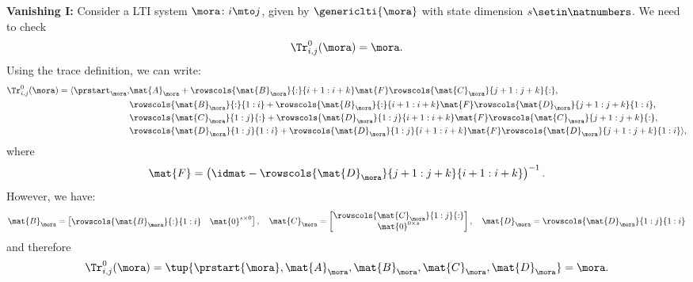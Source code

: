\begin{example}
\begin{equation*}
    \end{equation*}
    \textbf{Vanishing I:}
    Consider a LTI system $\mora\colon i\mto j$, given by $\genericlti{\mora}$ with state dimension $s\setin \natnumbers$.
    We need to check
    \begin{equation*}
        \Tr_{i,j}^0 (\mora)=\mora.
    \end{equation*}
    Using the trace definition, we can write:
    \begin{equation*}
        \begin{aligned}
            \Tr_{i,j}^0 (\mora)=\langle\prstart_{\mora}, & \mat{A}_\mora+\rowscols{\mat{B}_{\mora}}{:}{i+1:i+k}\mat{F}\rowscols{\mat{C}_{\mora}}{j+1:j+k}{:}, \\
                                                         & \rowscols{\mat{B}_{\mora}}{:}{1:i}+ \rowscols{\mat{B}_{\mora}}{:}{i+1:i+k}\mat{F}\rowscols{\mat{D}_{\mora}}{j+1:j+k}{1:i}, \\
                                                         & \rowscols{\mat{C}_{\mora}}{1:j}{:}+\rowscols{\mat{D}_{\mora}}{1:j}{i+1:i+k}\mat{F}\rowscols{\mat{C}_{\mora}}{j+1:j+k}{:}, \\
                                                         & \rowscols{\mat{D}_{\mora}}{1:j}{1:i}+ \rowscols{\mat{D}_{\mora}}{1:j}{i+1:i+k}\mat{F}\rowscols{\mat{D}_{\mora}}{j+1:j+k}{1:i}\rangle,
        \end{aligned}
    \end{equation*}
    where
    \begin{equation*}
        \mat{F}=\left(\idmat - \rowscols{\mat{D}_{\mora}}{j+1:j+k}{i+1:i+k}\right)^{-1}.
    \end{equation*}
    However, we have:
    \begin{equation*}
        \mat{B}_\mora=\begin{bmatrix}
            \rowscols{\mat{B}_{\mora}}{:}{1:i} & \mat{0}^{s\times 0}
        \end{bmatrix},\quad
        \mat{C}_\mora=\begin{bmatrix}
            \rowscols{\mat{C}_{\mora}}{1:j}{:} \\ \mat{0}^{0\times s}
        \end{bmatrix},
        \quad
        \mat{D}_\mora= \rowscols{\mat{D}_\mora}{1:j}{1:i}
    \end{equation*}
    and therefore
    \begin{equation*}
        \Tr_{i,j}^0 (\mora)=\tup{\prstart{\mora}, \mat{A}_\mora, \mat{B}_\mora, \mat{C}_\mora, \mat{D}_\mora}=\mora.
    \end{equation*}


\end{example}
